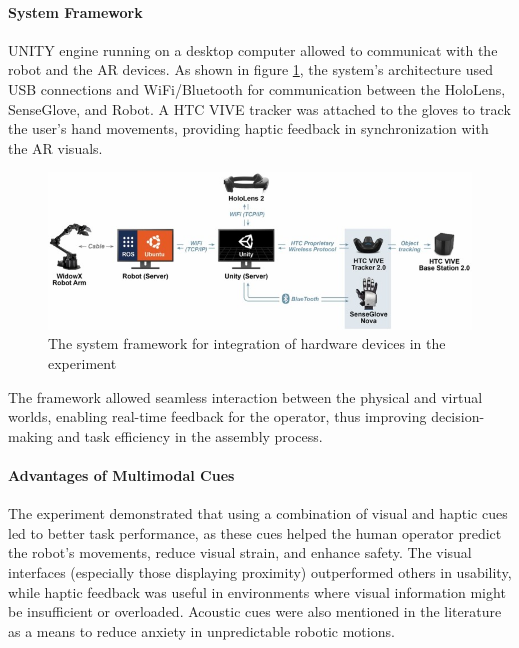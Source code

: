 \begin{enumerate}
    \paragraph{\textbf{System Framework}}
    UNITY engine running on a desktop computer allowed to communicat with the robot and the \ac{AR} devices. As shown in figure \ref{f:system-framework}, the system's architecture used USB connections and WiFi/Bluetooth for communication between the HoloLens, SenseGlove, and Robot. A HTC VIVE tracker was attached to the gloves to track the user's hand movements, providing haptic feedback in synchronization with the \ac{AR} visuals.

    \begin{figure}[!htpb]
        \centering
        \includegraphics[width=0.75\linewidth]{figs/system-framework.jpg}
        \caption{The system framework for integration of hardware devices in the experiment \cite{CHU2023313}}
        \label{f:system-framework}
    \end{figure}

    The framework allowed seamless interaction between the physical and virtual worlds, enabling real-time feedback for the operator, thus improving decision-making and task efficiency in the assembly process.

    \paragraph{\textbf{Advantages of Multimodal Cues}}
    The experiment demonstrated that using a combination of visual and haptic cues led to better task performance, as these cues helped the human operator predict the robot's movements, reduce visual strain, and enhance safety. The visual interfaces (especially those displaying proximity) outperformed others in usability, while haptic feedback was useful in environments where visual information might be insufficient or overloaded. Acoustic cues were also mentioned in the literature as a means to reduce anxiety in unpredictable robotic motions.



\end{enumerate}
